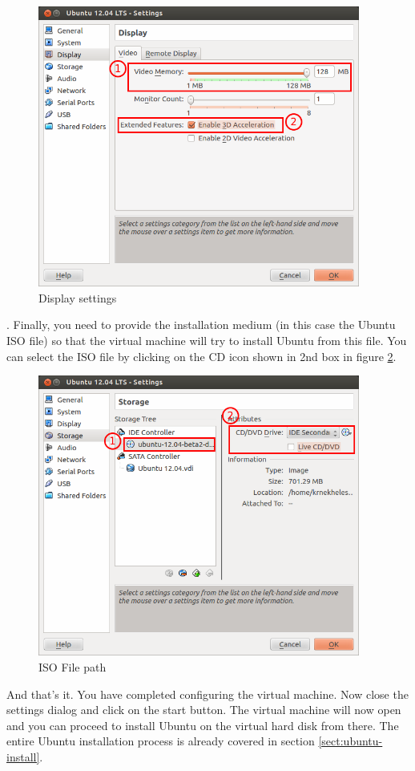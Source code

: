 \begin{figure}[!h]	
	\centering
	\includegraphics[width=300pt]{./images/installation/virtualbox/settings-display.png}
	\caption{Display settings}	
	\label{fig:settings-display}	
\end{figure}

\par {}. Finally, you need to provide the installation medium (in this case the Ubuntu ISO file) so that the virtual machine will try to install Ubuntu from this file. You can select the ISO file by clicking on the CD icon shown in 2nd box in figure \ref{fig:settings-storage}. \\

\begin{figure}[!h]	
	\centering
	\includegraphics[width=300pt]{./images/installation/virtualbox/settings-storage.png}
	\caption{ISO File path}	
	\label{fig:settings-storage}	
\end{figure}

\par \noindent And that's it. You have completed configuring the virtual machine. Now close the settings dialog and click on the start button. The virtual machine will now open and you can proceed to install Ubuntu on the virtual hard disk from there. The entire Ubuntu installation process is already covered in section \ref{sect:ubuntu-install}. \\




